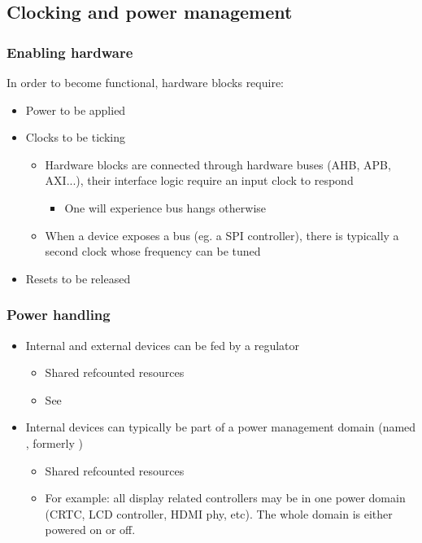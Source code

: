 \subsection{Clocking and power management}

\begin{frame}
  \frametitle{Enabling hardware}
  In order to become functional, hardware blocks require:
  \begin{itemize}
  \item Power to be applied
  \item Clocks to be ticking
    \begin{itemize}
    \item Hardware blocks are connected through hardware buses (AHB, APB,
      AXI...), their interface logic require an input clock to respond
      \begin{itemize}
      \item One will experience bus hangs otherwise
      \end{itemize}
    \item When a device exposes a bus (eg. a SPI controller), there is
      typically a second clock whose frequency can be tuned
    \end{itemize}
  \item Resets to be released
  \end{itemize}
\end{frame}

\begin{frame}
  \frametitle{Power handling}
  \begin{itemize}
  \item Internal and external devices can be fed by a regulator
    \begin{itemize}
    \item Shared refcounted resources
    \item See  
    \end{itemize}
  \item Internal devices can typically be part of a power management domain
    (named , formerly )
    \begin{itemize}
    \item Shared refcounted resources
    \item For example: all display related controllers may be in one power
      domain (CRTC, LCD controller, HDMI phy, etc). The whole domain
      is either powered on or off.
    \end{itemize}
  \end{itemize}
\end{frame}

